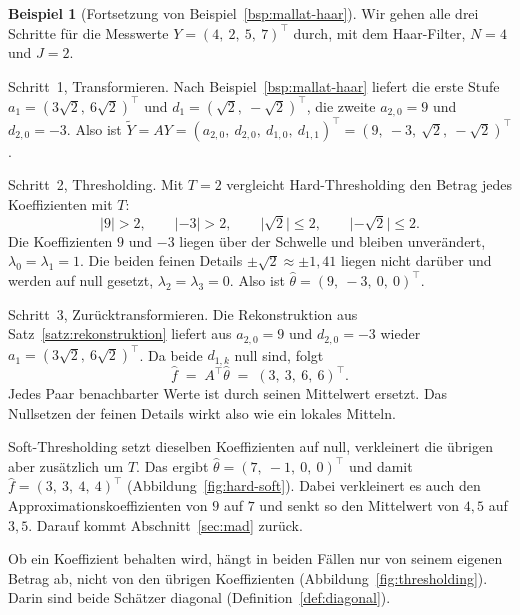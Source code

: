\documentclass[a4paper,11pt,bibliography=totoc,listof=totoc,headinclude=true,cleardoublepage=empty,oneside]{scrbook}
\theoremstyle{plain}
\theoremstyle{definition}
\newtheorem{Beispiel}[Satz]{Beispiel}
\begin{document}
\begin{Beispiel}[Fortsetzung von Beispiel~\ref{bsp:mallat-haar}]
\label{bsp:diagonal}
Wir gehen alle drei Schritte für die Messwerte $Y = (4,\ 2,\ 5,\ 7)^\top$
durch, mit dem Haar-Filter, $N = 4$ und $J = 2$.

Schritt~1, Transformieren. Nach Beispiel~\ref{bsp:mallat-haar} liefert die
erste Stufe $a_1 = (3\sqrt2,\ 6\sqrt2)^\top$ und $d_1 = (\sqrt2,\ -\sqrt2)^\top$,
die zweite $a_{2,0} = 9$ und $d_{2,0} = -3$. Also ist
$\tilde Y = AY = (a_{2,0},\ d_{2,0},\ d_{1,0},\ d_{1,1})^\top
= (9,\ -3,\ \sqrt2,\ -\sqrt2)^\top$.

Schritt~2, Thresholding. Mit $T = 2$ vergleicht Hard-Thresholding den Betrag
jedes Koeffizienten mit $T$:
\[
  \lvert 9\rvert > 2, \qquad \lvert -3\rvert > 2, \qquad
  \lvert \sqrt2\rvert \le 2, \qquad \lvert -\sqrt2\rvert \le 2 .
\]
Die Koeffizienten $9$ und $-3$ liegen über der Schwelle und bleiben
unverändert, $\lambda_0 = \lambda_1 = 1$. Die beiden feinen Details
$\pm\sqrt2\approx\pm1{,}41$ liegen nicht darüber und werden auf null gesetzt,
$\lambda_2 = \lambda_3 = 0$. Also ist $\hat\theta = (9,\ -3,\ 0,\ 0)^\top$.

Schritt~3, Zurücktransformieren. Die Rekonstruktion aus
Satz~\ref{satz:rekonstruktion} liefert aus $a_{2,0} = 9$ und $d_{2,0} = -3$
wieder $a_1 = (3\sqrt2,\ 6\sqrt2)^\top$. Da beide $d_{1,k}$ null sind, folgt
\[
  \hat f \;=\; A^\top\hat\theta \;=\; (3,\ 3,\ 6,\ 6)^\top .
\]
Jedes Paar benachbarter Werte ist durch seinen Mittelwert ersetzt. Das
Nullsetzen der feinen Details wirkt also wie ein lokales Mitteln.

Soft-Thresholding setzt dieselben Koeffizienten auf null, verkleinert die
übrigen aber zusätzlich um $T$. Das ergibt $\hat\theta = (7,\ -1,\ 0,\ 0)^\top$
und damit $\hat f = (3,\ 3,\ 4,\ 4)^\top$ (Abbildung~\ref{fig:hard-soft}).
Dabei verkleinert es auch den Approximationskoeffizienten von $9$ auf $7$ und
senkt so den Mittelwert von $4{,}5$ auf $3{,}5$. Darauf kommt
Abschnitt~\ref{sec:mad} zurück.

Ob ein Koeffizient behalten wird, hängt in beiden Fällen nur von seinem eigenen
Betrag ab, nicht von den übrigen Koeffizienten (Abbildung~\ref{fig:thresholding}).
Darin sind beide Schätzer diagonal (Definition~\ref{def:diagonal}).
\end{Beispiel}
 
\end{document}
